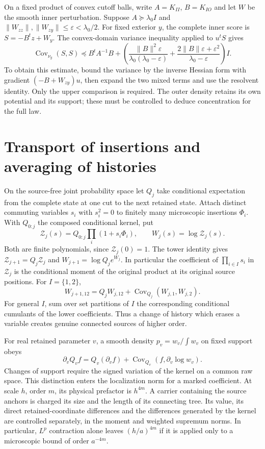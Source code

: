 \documentclass[11pt,letterpaper]{article}
\begin{document}
On a fixed product of convex cutoff balls, write \(A=K_{II}\),
\(B=K_{IO}\) and let \(W\) be the smooth inner perturbation. Suppose
\(A\succeq\lambda_0 I\) and
\(\|W_{zz}\|,\|W_{zy}\|\le\varepsilon<\lambda_0/2\). For fixed
exterior \(y\), the complete inner score is \(S=-B^tz+W_y\).
The convex-domain variance inequality applied to \(u^tS\) gives
\[
 \operatorname{Cov}_{\nu_y}(S,S)
 \preceq B^tA^{-1}B+
 \left(\frac{\|B\|^2\varepsilon}{\lambda_0(\lambda_0-\varepsilon)}
       +\frac{2\|B\|\varepsilon+\varepsilon^2}
              {\lambda_0-\varepsilon}\right)I .
\]
To obtain this estimate, bound the variance by the inverse Hessian
form with gradient \((-B+W_{zy})u\), then expand the two mixed terms
and use the resolvent identity. Only the upper comparison is required.
The outer density retains its own potential and its support; these
must be controlled to deduce concentration for the full law.

\section{Transport of insertions and averaging of histories}

On the source-free joint probability space let \(Q_j\) take conditional
expectation from the complete state at one cut to the next retained state.
Attach distinct commuting variables \(s_i\) with \(s_i^2=0\) to finitely
many microscopic insertions \(\Phi_i\). With \(Q_{0:j}\) the composed
conditional kernel, put
\[
 \mathcal Z_j(s)=Q_{0:j}\prod_i(1+s_i\Phi_i),\qquad
 W_j(s)=\log\mathcal Z_j(s).
\]
Both are finite polynomials, since \(\mathcal Z_j(0)=1\). The tower
identity gives \(\mathcal Z_{j+1}=Q_j\mathcal Z_j\) and
\(W_{j+1}=\log Q_j e^{W_j}\). In particular the coefficient of
\(\prod_{i\in I}s_i\) in \(\mathcal Z_j\) is the conditional moment
of the original product at its original source positions. For \(I=\{1,2\}\),
\[
 W_{j+1,12}=Q_j W_{j,12}
       +\operatorname{Cov}_{Q_j}(W_{j,1},W_{j,2}).
\]
For general \(I\), sum over set partitions of \(I\) the corresponding
conditional cumulants of the lower coefficients. Thus a change of history
which erases a variable creates genuine connected sources of higher order.

For real retained parameter \(v\), a smooth density \(p_v=w_v/\int w_v\)
on fixed support obeys
\[
 \partial_v Q_v f=Q_v(\partial_v f)
        +\operatorname{Cov}_{Q_v}(f,\partial_v\log w_v).
\]
Changes of support require the signed variation of the kernel on a common
raw space. This distinction enters the localization norm for a marked
coefficient. At scale \(h\), order \(m\), its physical prefactor is \(h^{4m}\).
A carrier containing the source anchors is charged its size and the
length of its connecting tree. Its value, its direct retained-coordinate
differences and the differences generated by the kernel are controlled
separately, in the moment and weighted supremum norms. In particular,
\(L^p\) contraction alone leaves \((h/a)^{4m}\) if it is applied only to
a microscopic bound of order \(a^{-4m}\).
\end{document}
